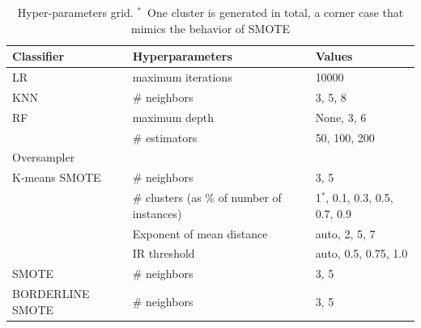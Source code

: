 \documentclass[information,article,submit,moreauthors,pdftex]{Definitions/mdpi}
\begin{document}
\begin{table}
	\centering
    \captionsetup{justification=centering}
    \caption{Hyper-parameters grid. $^*$~One cluster is generated in total, a
    corner case that mimics the behavior of SMOTE
    }\label{tab:grid}
    \begin{tabular}{lll}
		\toprule
		Classifier       & Hyperparameters      & Values                            \\
		\midrule
		LR               & maximum iterations   & 10000                             \\
		KNN              & \# neighbors  & {3, 5, 8}                            \\
		RF               & maximum depth        & {None, 3, 6}                      \\
		                 & \# estimators & {50, 100, 200}                         \\
		\toprule
		Oversampler      &                      &                                   \\
		\midrule
        K-means SMOTE    & \# neighbors  & {3, 5}                            \\
		                 & \# clusters (as \% of number of instances)   & {1$^*$, 0.1, 0.3, 0.5, 0.7, 0.9}      \\
                         & Exponent of mean distance & {auto, 2, 5, 7}       \\
                         & IR threshold  & {auto, 0.5, 0.75, 1.0}            \\
		SMOTE            & \# neighbors  & {3, 5}                            \\
		BORDERLINE SMOTE & \# neighbors  & {3, 5}                            \\
		\bottomrule
	\end{tabular}
\end{table}
\end{document}
